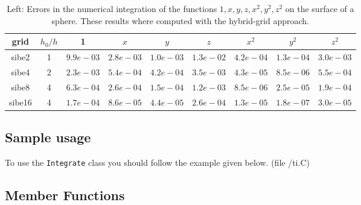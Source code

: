 


\begin{table}[hbt]
\begin{center}
\begin{tabular}{|c|c|c|c|c|c|c|c|c|} \hline 
  grid  &  $h_0/h$ &    1      &   $x$ & $y$ & $z$  &   $x^2$ & $y^2$ & $z^2$      \\   \hline\hline 
 sibe2  &    1     & $9.9e-03$ & $2.8e-03$&$1.0e-03$&$1.3e-02$ & $4.2e-04$&$1.3e-04$&$3.0e-03$    \\ 
 sibe4  &    2     & $2.3e-03$ & $5.4e-04$&$4.2e-04$&$3.5e-03$ & $4.3e-05$&$8.5e-06$&$5.5e-04$    \\ 
 sibe8  &    4     & $6.3e-04$ & $2.6e-04$&$1.5e-04$&$1.2e-03$ & $8.5e-06$&$2.5e-05$&$1.9e-04$    \\ \hline 
 sibe16 &    4     & $1.7e-04$ & $8.6e-05$&$4.4e-05$&$2.6e-04$ & $1.3e-05$&$1.8e-07$&$3.0e-05$    \\ \hline 
\end{tabular}	
\qquad
\end{center}		
\caption{Left: Errors in the numerical integration of the functions $1,x,y,z,x^2,y^2,z^2$
on the surface of a sphere.
These results where computed with the hybrid-grid approach.}
 \label{tab:sib-hyb} 
\end{table}


\clearpage
\subsection{Sample usage}

To use the {\tt Integrate} class you should follow the example given below.
(file {\ff \examples/ti.C})
{\footnotesize
{}
}


\subsection{Member Functions}



